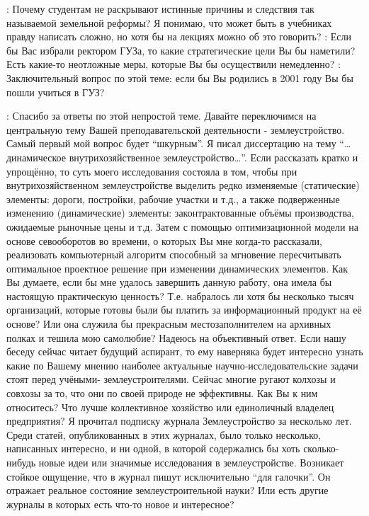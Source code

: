 \begin{drama}
	\maxspeaks: Почему студентам не раскрывают истинные причины и следствия так называемой земельной реформы? Я понимаю, что может быть в учебниках правду написать сложно, но хотя бы на лекциях можно об это говорить?
	\maxspeaks: Если бы Вас избрали ректором ГУЗа, то какие стратегические цели Вы бы наметили? Есть какие-то неотложные меры, которые Вы бы осуществили немедленно?
	\maxspeaks: Заключительный вопрос по этой теме: если бы Вы родились в 2001 году Вы бы пошли учиться в ГУЗ?

	\maxspeaks: Спасибо за ответы по этой непростой теме. Давайте переключимся на центральную тему Вашей преподавательской деятельности - землеустройство.
Самый первый мой вопрос будет “шкурным”. Я писал диссертацию на тему “…динамическое внутрихозяйственное землеустройство…”. Если рассказать кратко и упрощённо, то суть моего исследования состояла в том, чтобы при внутрихозяйственном землеустройстве выделить редко изменяемые (статические) элементы: дороги, постройки, рабочие участки и т.д., а также подверженные изменению (динамические) элементы:  законтрактованные объёмы производства, ожидаемые рыночные цены и т.д. Затем с помощью оптимизационной модели на основе севооборотов во времени, о которых Вы мне когда-то рассказали, реализовать компьютерный алгоритм способный за мгновение пересчитывать оптимальное проектное решение при изменении динамических элементов. 
Как Вы думаете, если бы мне удалось завершить данную работу, она имела бы настоящую практическую ценность? Т.е. набралось ли хотя бы несколько тысяч организаций, которые готовы были бы платить за информационный продукт на её основе? Или она служила бы прекрасным местозаполнителем на архивных полках и тешила мою самолюбие? Надеюсь на объективный ответ.
Если нашу беседу сейчас читает будущий аспирант, то ему наверняка будет интересно узнать какие по Вашему мнению наиболее актуальные научно-исследовательские задачи стоят перед учёными- землеустроителями.
Сейчас многие ругают колхозы и совхозы за то, что они по своей природе не эффективны. Как Вы к ним относитесь? Что лучше коллективное хозяйство или единоличный владелец предприятия?
Я прочитал подписку журнала Землеустройство за несколько лет. Среди статей, опубликованных в этих журналах, было только несколько, написанных интересно, и ни одной, в которой содержались бы хоть сколько-нибудь новые идеи или значимые исследования в землеустройстве. Возникает стойкое ощущение, что в журнал пишут исключительно “для галочки”. Он отражает реальное состояние землеустроительной науки? Или есть другие журналы в которых есть что-то новое и интересное?

\end{drama}
